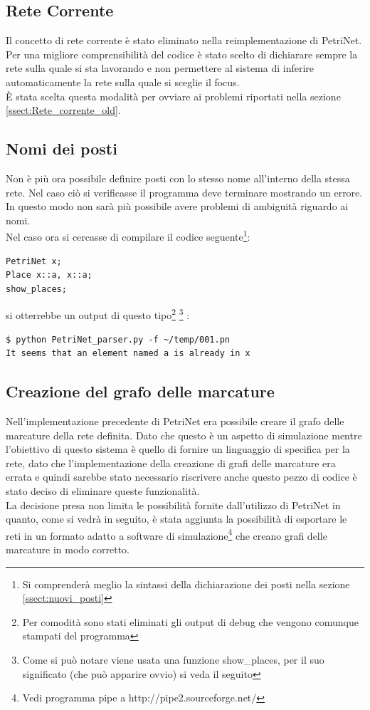 \documentclass[italian,12pt]{book}
\begin{document}
\subsection{Rete Corrente}\label{ssect:rete_corrente_new}
Il concetto di rete corrente è stato eliminato nella reimplementazione di PetriNet. Per 
una migliore comprensibilità del codice è stato scelto di dichiarare sempre la rete sulla quale si 
sta lavorando e non permettere al sistema di inferire automaticamente la rete sulla quale 
si sceglie il focus.\\
È stata scelta questa modalità per ovviare ai problemi riportati nella sezione 
\ref{ssect:Rete_corrente_old}.

\subsection{Nomi dei posti}
Non è più ora possibile definire posti con lo stesso nome all'interno della stessa rete. Nel 
caso ciò si verificasse il programma deve terminare mostrando un errore. In questo modo non sarà 
più possibile avere problemi di ambiguità riguardo ai nomi.\\
Nel caso ora si cercasse di compilare il codice seguente\footnote{Si comprenderà meglio la sintassi della 
dichiarazione dei posti nella sezione \ref{ssect:nuovi_posti}}:
\begin{verbatim}PetriNet x;
Place x::a, x::a;
show_places;
\end{verbatim}
si otterrebbe un output di questo tipo\footnote{Per comodità sono stati eliminati gli output di 
debug che vengono comunque stampati del programma} \footnote{Come si può notare viene usata una 
funzione show\_places, per il suo significato (che può apparire ovvio) si veda il seguito} :
\begin{verbatim}
$ python PetriNet_parser.py -f ~/temp/001.pn 
It seems that an element named a is already in x
\end{verbatim}

\subsection{Creazione del grafo delle marcature}\label{ssect:creazione_grafo_marcature}
Nell'implementazione precedente di PetriNet era possibile creare il grafo delle 
marcature della rete definita. Dato che questo è un aspetto di simulazione mentre 
l'obiettivo di questo sistema è quello di fornire un linguaggio di specifica per la rete,
dato che l'implementazione della creazione di grafi delle marcature era errata e quindi
sarebbe stato necessario riscrivere anche questo pezzo di codice è stato deciso di 
eliminare queste funzionalità.\\
La decisione presa non limita le possibilità fornite dall'utilizzo di PetriNet in quanto, come
si vedrà in seguito, è stata aggiunta la possibilità di esportare le reti in un formato adatto a 
software di simulazione\footnote{Vedi programma pipe a http://pipe2.sourceforge.net/} che creano 
grafi delle marcature in modo corretto.
\end{document}
